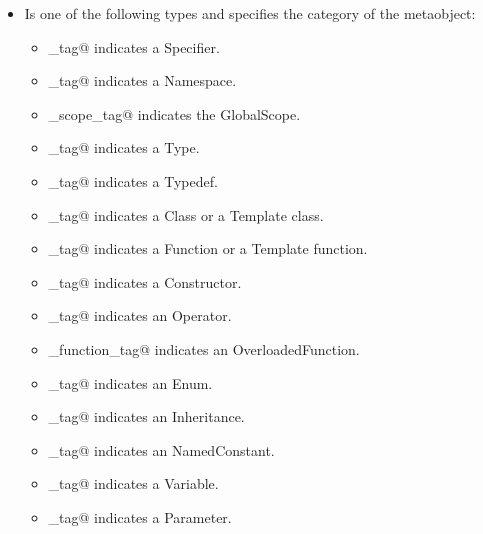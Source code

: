 \begin{itemize}
\item{\verb@category@} Is one of the following types and specifies the category
of the metaobject:
	\begin{itemize}
		\item{\verb@specifier_tag@} indicates a {\metaobject Specifier}.

		\item{\verb@namespace_tag@} indicates a {\metaobject Namespace}.

		\item{\verb@global_scope_tag@} indicates the {\metaobject GlobalScope}.

		\item{\verb@type_tag@} indicates a {\metaobject Type}.

		\item{\verb@typedef_tag@} indicates a {\metaobject Typedef}.

		\item{\verb@class_tag@} indicates a {\metaobject Class}
		or a {\metaobject Template} class.

		\item{\verb@function_tag@} indicates a {\metaobject Function}
		or a {\metaobject Template} function.

		\item{\verb@constructor_tag@} indicates a {\metaobject Constructor}.

		\item{\verb@operator_tag@} indicates an {\metaobject Operator}.

		\item{\verb@overloaded_function_tag@} indicates an {\metaobject OverloadedFunction}.

		\item{\verb@enum_tag@} indicates an {\metaobject Enum}.

		\item{\verb@inheritance_tag@} indicates an {\metaobject Inheritance}.

		\item{\verb@constant_tag@} indicates an {\metaobject NamedConstant}.

		\item{\verb@variable_tag@} indicates a {\metaobject Variable}.

		\item{\verb@parameter_tag@} indicates a {\metaobject Parameter}.
	\end{itemize}


\end{itemize}
